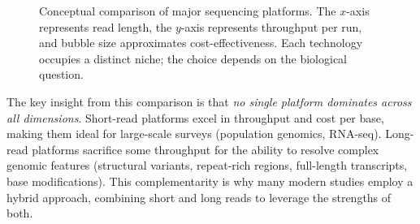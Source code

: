 \begin{figure}[htbp]
\centering
{}
\caption[Sequencing platform comparison.]{Conceptual comparison of major sequencing platforms. The $x$-axis represents read length, the $y$-axis represents throughput per run, and bubble size approximates cost-effectiveness. Each technology occupies a distinct niche; the choice depends on the biological question.}
\label{fig:intro:platform-bubbles}
\end{figure}

The key insight from this comparison is that \textit{no single platform dominates across all dimensions}. Short-read platforms excel in throughput and cost per base, making them ideal for large-scale surveys (population genomics, RNA-seq). Long-read platforms sacrifice some throughput for the ability to resolve complex genomic features (structural variants, repeat-rich regions, full-length transcripts, base modifications). This complementarity is why many modern studies employ a hybrid approach, combining short and long reads to leverage the strengths of both.



